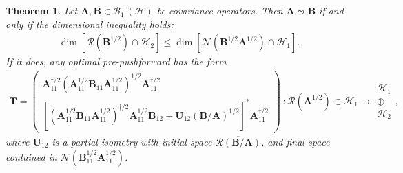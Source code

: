 \documentclass[noinfoline]{imsart}\setcounter{tocdepth}{2}
\newcommand{\m}[1]{\mathbf{#1}} %
\renewcommand{\c}[1]{\mathcal{#1}} %
\theoremstyle{plain}
\newtheorem{theorem}{Theorem}[section]
\begin{document}

\begin{theorem}\label{thm:sol:sym:inf}
Let $\m{A}, \m{B} \in \c{B}_{1}^{+}(\c{H})$ be covariance operators.
Then $\m{A} \leadsto \m{B}$ if and only if the dimensional inequality holds:
\begin{align*}
    \dim [\c{R}(\m{B}^{1/2}) \cap \c{H}_{2}] \le \dim [\c{N}(\m{B}^{1/2} \m{A}^{1/2}) \cap \c{H}_{1}].
\end{align*}
If it does, any optimal pre-pushforward has the form
\begin{align}\label{eq:sol:set}
    \m{T} = 
    \begin{pmatrix}
    \m{A}_{11}^{\dagger/2} (\m{A}_{11}^{1/2} \m{B}_{11} \m{A}_{11}^{1/2})^{1/2} \m{A}_{11}^{\dagger/2} \\
    [(\m{A}_{11}^{1/2} \m{B}_{11} \m{A}_{11}^{1/2})^{\dagger/2} \m{A}_{11}^{1/2} \m{B}_{12} + \m{U}_{12} (\m{B}/\m{A})^{1/2}]^{*} \m{A}_{11}^{\dagger/2}
    \end{pmatrix}
    \    :
    \c{R}(\m{A}^{1/2}) \subset \c{H}_{1}
    \rightarrow
    \begin{array}{c}
    \c{H}_{1} \\
    \oplus \\
    \c{H}_{2}
    \end{array},
\end{align}
where $\m{U}_{12}$ is a partial isometry with initial space $\overline{\c{R}(\m{B}/\m{A})}$, and final space contained in $\c{N}(\m{B}_{11}^{1/2} \m{A}_{11}^{1/2})$.
\end{theorem}
\end{document}
